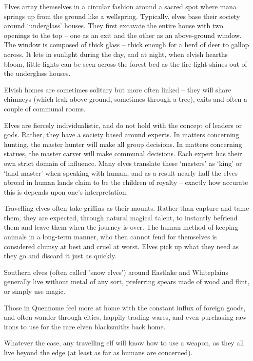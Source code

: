 \begin{multicols}{2}

\noindent
Elves array themselves in a circular fashion around a sacred spot where mana springs up from the ground like a wellspring.
Typically, elves base their society around `underglass' houses.
They first excavate the entire house with two openings to the top -- one as an exit and the other as an above-ground window.
The window is composed of thick glass -- thick enough for a herd of deer to gallop across.
It lets in sunlight during the day, and at night, when elvish hearths bloom, little lights can be seen across the forest bed as the fire-light shines out of the underglass houses.

Elvish homes are sometimes solitary but more often linked -- they will share chimneys (which leak above ground, sometimes through a tree), exits and often a couple of communal rooms.

Elves are fiercely individualistic, and do not hold with the concept of leaders or gods. Rather, they have a society based around experts. In matters concerning hunting, the master hunter will make all group decisions. In matters concerning statues, the master carver will make communal decisions. Each expert has their own strict domain of influence. Many elves translate these `masters' as `king' or `land master' when speaking with human, and as a result nearly half the elves abroad in human lands claim to be the children of royalty -- exactly how accurate this is depends upon one's interpretation.

Travelling elves often take griffins as their mounts. Rather than capture and tame them, they are expected, through natural magical talent, to instantly befriend them and leave them when the journey is over. The human method of keeping animals in a long-term manner, who then cannot fend for themselves is considered clumsy at best and cruel at worst. Elves pick up what they need as they go and discard it just as quickly.

Southern elves (often called 'snow elves') around Eastlake and Whiteplains generally live without metal of any sort, preferring spears made of wood and flint, or simply use magic.

Those in Quennome feel more at home with the constant influx of foreign goods, and often wander through cities, happily trading wares, and even purchasing raw irons to use for the rare elven blacksmiths back home.

Whatever the case, any travelling elf will know how to use a weapon, as they all live beyond the \gls{edge} (at least as far as humans are concerned).


\end{multicols}
